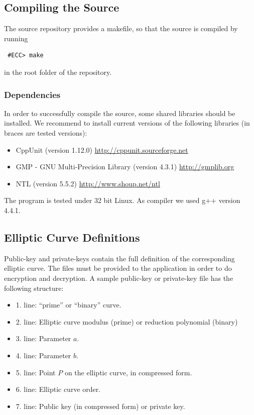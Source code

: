 \documentclass[11pt,english]{article}
\begin{document}
\subsection{Compiling the Source}
The source repository provides a makefile, so that the source is compiled by running
\begin{verbatim}
 #ECC> make
\end{verbatim}
in the root folder of the repository.

\subsubsection{Dependencies}
In order to successfully compile the source, some shared libraries should be installed. We recommend to install current versions of the following libraries (in braces are tested versions):

\begin{itemize}
 \item CppUnit (version 1.12.0) \url{http://cppunit.sourceforge.net}
 \item GMP - GNU Multi-Precision Library (version 4.3.1) \url{http://gmplib.org}
 \item NTL (version 5.5.2) \url{http://www.shoup.net/ntl}
\end{itemize}

The program is tested under 32 bit Linux. As compiler we used g++ version 4.4.1.

\subsection{Elliptic Curve Definitions}
\label{ecdefinitions}
Public-key and private-keys contain the full definition of the corresponding elliptic curve. The files must be provided to the application in order to do encryption and decryption. A sample public-key or private-key file has the following structure:

\begin{itemize}
 \item 1. line: ``prime'' or ``binary'' curve.
 \item 2. line: Elliptic curve modulus (prime) or reduction polynomial (binary)
 \item 3. line: Parameter $a$.
 \item 4. line: Parameter $b$.
 \item 5. line: Point $P$ on the elliptic curve, in compressed form.
 \item 6. line: Elliptic curve order.
 \item 7. line: Public key (in compressed form) or private key.
\end{itemize}
\end{document}
